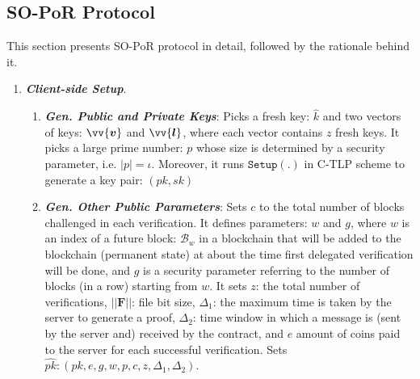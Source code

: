 %

\subsection{SO-PoR Protocol}\label{SO-PoR-Protocol}
This section presents SO-PoR protocol in detail, followed by the rationale behind it.      





\begin{enumerate}[leftmargin=.46cm]

\item\textit{\textbf{Client-side Setup}}. 



\begin{enumerate}


\item  \textbf{\textit{\small {Gen. Public and Private Keys}}}:   Picks a fresh key: $\hat{k}$ and two vectors of keys: $\vv{\bm{v}}$ and $\vv{\bm{l}}$, where each vector contains $z$ fresh keys. It picks a large prime number:  $p$ whose size is determined by a security parameter, i.e. $|p|=\iota$.  Moreover, it runs $\mathtt{Setup}(.)$ in  C-TLP scheme to generate a key pair: $(pk, sk)$

\item \textbf{\textit{\small {Gen. Other Public Parameters}}}:  Sets $c$ to the total number of blocks challenged in each verification. It defines  parameters: $w$ and $g$, where  $w$ is an index  of a future block: $\mathcal {B}_{\scriptscriptstyle w}$ in a blockchain that will be added to the blockchain (permanent state) at about the time  first delegated verification will  be done, and $g$ is  a security parameter referring to the number of blocks (in a row) starting from  $w$.  It  sets $z$: the total number of verifications,  $||{\bm{F}}||$: file bit size, $\Delta_{\scriptscriptstyle 1}$:  the maximum time  is taken by the server to generate a proof, $\Delta_{\scriptscriptstyle 2}$: time window in which a message is (sent by the server and) received by the contract, and $e$ amount of coins paid to the server for each successful  verification. Sets $\hat{pk}: (pk,e,g,w,p,c,z,\Delta_{\scriptscriptstyle 1},\Delta_{\scriptscriptstyle 2})$. 



\end{enumerate}
\end{enumerate}
